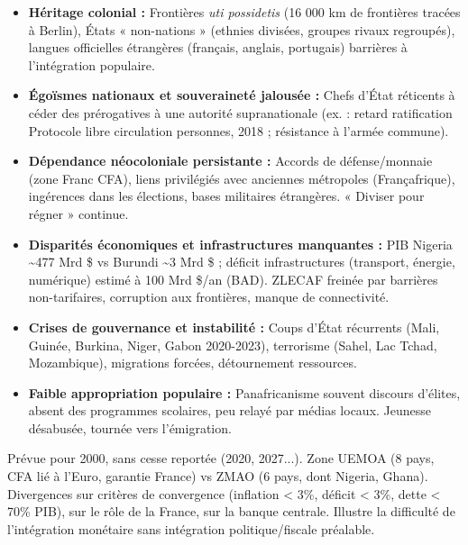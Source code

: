 \documentclass[11pt]{article}
\begin{document}
\begin{definition}
\begin{itemize}
\item \textbf{Héritage colonial :} Frontières \emph{uti possidetis} (16 000 km de frontières tracées à Berlin), États « non-nations » (ethnies divisées, groupes rivaux regroupés), langues officielles étrangères (français, anglais, portugais) barrières à l'intégration populaire.
\item \textbf{Égoïsmes nationaux et souveraineté jalousée :} Chefs d'État réticents à céder des prérogatives à une autorité supranationale (ex. : retard ratification Protocole libre circulation personnes, 2018 ; résistance à l'armée commune).
\item \textbf{Dépendance néocoloniale persistante :} Accords de défense/monnaie (zone Franc CFA), liens privilégiés avec anciennes métropoles (Françafrique), ingérences dans les élections, bases militaires étrangères. « Diviser pour régner » continue.
\item \textbf{Disparités économiques et infrastructures manquantes :} PIB Nigeria \textasciitilde 477 Mrd \$ vs Burundi \textasciitilde 3 Mrd \$ ; déficit infrastructures (transport, énergie, numérique) estimé à 100 Mrd \$/an (BAD). ZLECAF freinée par barrières non-tarifaires, corruption aux frontières, manque de connectivité.
\item \textbf{Crises de gouvernance et instabilité :} Coups d'État récurrents (Mali, Guinée, Burkina, Niger, Gabon 2020-2023), terrorisme (Sahel, Lac Tchad, Mozambique), migrations forcées, détournement ressources.
\item \textbf{Faible appropriation populaire :} Panafricanisme souvent discours d'élites, absent des programmes scolaires, peu relayé par médias locaux. Jeunesse désabusée, tournée vers l'émigration.
\end{itemize}
\end{definition}

\begin{savaistu}
Prévue pour 2000, sans cesse reportée (2020, 2027...). Zone UEMOA (8 pays, CFA lié à l'Euro, garantie France) vs ZMAO (6 pays, dont Nigeria, Ghana). Divergences sur critères de convergence (inflation < 3\%, déficit < 3\%, dette < 70\% PIB), sur le rôle de la France, sur la banque centrale. Illustre la difficulté de l'intégration monétaire sans intégration politique/fiscale préalable.
\end{savaistu}
\end{document}
